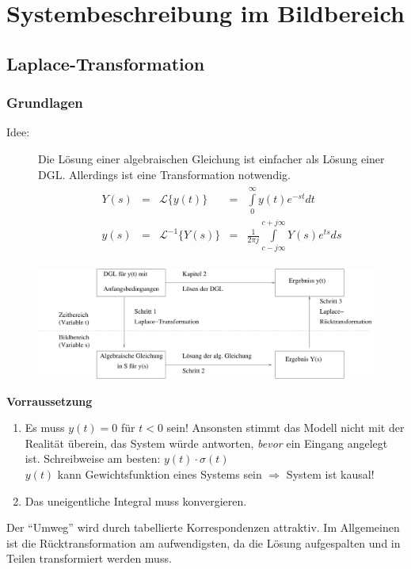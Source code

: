 \documentclass[12pt,a4paper,ngerman]{scrartcl}
\begin{document}
\section{Systembeschreibung im Bildbereich}

\subsection{Laplace-Transformation}

\subsubsection{Grundlagen}

\begin{description}
\item[Idee:] Die Lösung einer algebraischen Gleichung ist einfacher als Lösung einer DGL. Allerdings ist eine Transformation notwendig.
  \begin{align*}
    \begin{array}{lllll}
    Y(s)&=&\mathcal{L}\{y(t)\} &=& \int\limits_0^\infty{y(t)e^{-st}dt}\\
    y(s)&=&\mathcal{L}^{-1}\{Y(s)\} &=&\frac{1}{2\pi j} \int\limits_{c-j\infty}^{c+j\infty}{Y(s)e^{ts}ds}
    \end{array}
  \end{align*}
\end{description}
\begin{figure}[H]
  \centering
  \includegraphics[width=\linewidth]{sysregel_laplace}
\end{figure}
\textbf{Vorraussetzung}
  \begin{enumerate}
  \item Es muss $y(t)=0$ für $t<0$ sein! Ansonsten stimmt das Modell nicht mit der Realität überein, das System würde antworten, \emph{bevor} ein Eingang angelegt ist. Schreibweise am besten: $y(t)\cdot \sigma (t)$\\
$y(t)$ kann Gewichtsfunktion eines Systems sein $\Rightarrow$ System ist kausal!

\item Das uneigentliche Integral muss konvergieren.
  \end{enumerate}
Der ``Umweg'' wird durch tabellierte Korrespondenzen attraktiv. Im Allgemeinen ist die Rücktransformation am aufwendigsten, da die Lösung aufgespalten und in Teilen transformiert werden muss.
\end{document}
